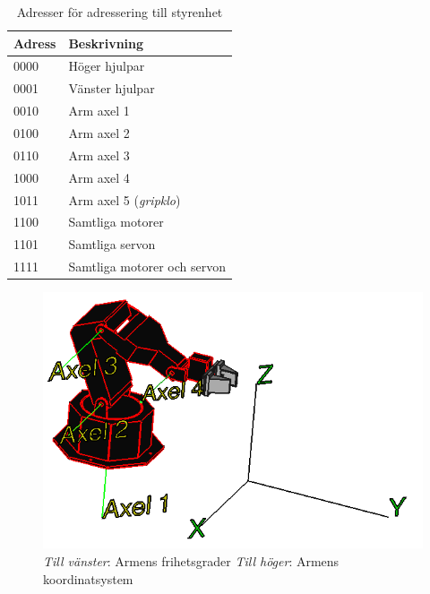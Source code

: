 \begin{table}[h]
	\centering
		\begin{tabularx}{\textwidth}{| l | X |}
			\hline
			\textbf{Adress} & \textbf{Beskrivning} \\
			\hline
			{0000} & {Höger hjulpar} \\
			\hline
			{0001} & {Vänster hjulpar} \\
			\hline
			{0010} & {Arm axel 1} \\ %
			\hline
			{0100} & {Arm axel 2} \\
			\hline
			{0110} & {Arm axel 3} \\
			\hline
			{1000} & {Arm axel 4} \\
			\hline
			{1011} & {Arm axel 5 (\textit{gripklo})} \\ %
			\hline
			{1100} & {Samtliga motorer} \\
			\hline
			{1101} & {Samtliga servon} \\
			\hline
			{1111} & {Samtliga motorer och servon} \\
			\hline
		\end{tabularx}
	\caption{Adresser för adressering till styrenhet} \label{protokoll:pc-motor-adress-tabell}
\end{table}

\begin{figure}[h]
\centerline{\includegraphics[scale=0.4]{robotaxis}}
\caption{\textit{Till vänster}: Armens frihetsgrader  \textit{Till höger}: Armens koordinatsystem}
\end{figure}
